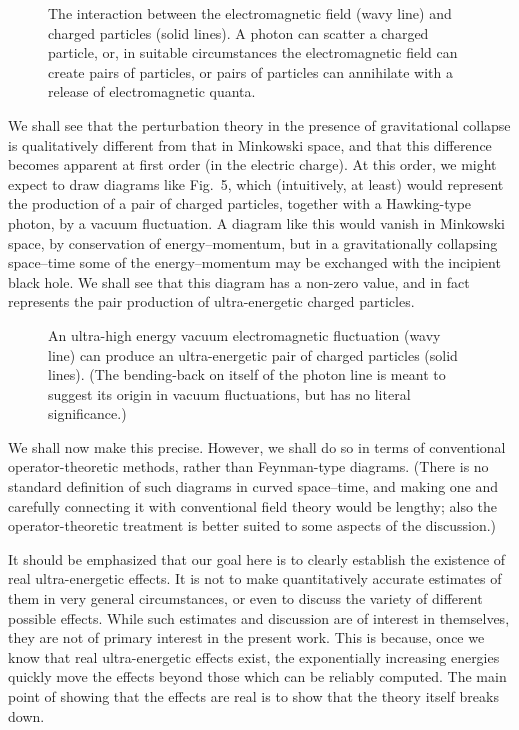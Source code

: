 \documentclass[11pt]{article}
\begin{document}
\begin{figure}
\epsfxsize=1in
\caption{The interaction between the electromagnetic field (wavy line) and
charged particles (solid lines).  A photon can scatter a charged particle, or,
in suitable circumstances the electromagnetic field can create pairs of
particles, or pairs of particles can annihilate with a release of 
electromagnetic quanta.
}
\end{figure}

We shall see that the perturbation theory in the presence of
gravitational collapse is qualitatively different from that in
Minkowski space, and that this difference becomes apparent at first
order (in the electric charge).  At this order, we might expect to
draw diagrams like Fig.~5, which (intuitively, at least) would
represent the production of a pair of charged particles,
together with a Hawking-type photon, by a vacuum fluctuation.
A diagram like this would vanish in Minkowski space, by conservation
of energy--momentum, but in a gravitationally collapsing space--time
some of the energy--momentum may be exchanged with the incipient black
hole.  We shall see that this diagram has a non-zero value, and in
fact represents the pair production of ultra-energetic charged
particles.

\begin{figure}
\epsfxsize=2in
\caption{An ultra-high energy vacuum electromagnetic fluctuation (wavy
line) can produce an ultra-energetic pair of charged particles
(solid lines).  (The bending-back on itself of the photon line is meant to
suggest its origin in vacuum fluctuations, but has no
literal significance.)
}
\end{figure}

We shall now make this precise.  However, we shall do so in terms of
conventional operator-theoretic methods, rather than Feynman-type diagrams. 
(There is no standard definition of such diagrams in curved space--time, and
making one and carefully connecting it with conventional field theory would be
lengthy; also the operator-theoretic treatment is better suited to some aspects
of the discussion.)

It should be emphasized that our goal here is to clearly establish the existence
of real ultra-energetic effects.  It is not to make quantitatively accurate
estimates of them in very general circumstances, or even to discuss the variety
of different possible effects.  While such estimates and
discussion are of interest in themselves, they are not of primary interest in
the present work.  This is because, once we know that real ultra-energetic
effects exist, the exponentially increasing energies quickly move the effects
beyond those which can be reliably computed.  The main point of showing that the
effects are real is to show that the theory itself breaks down.
\end{document}
